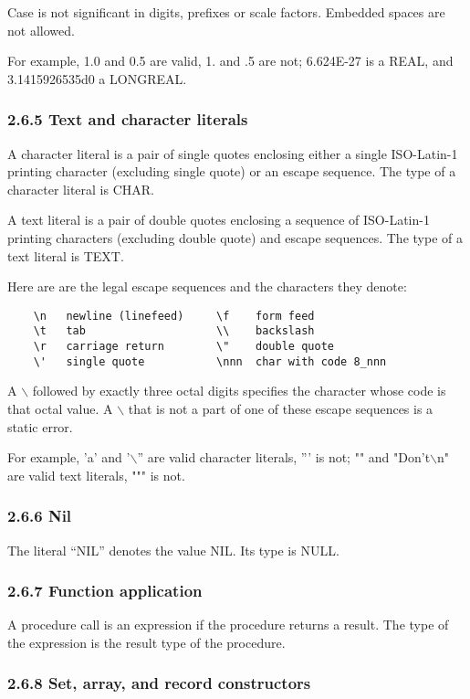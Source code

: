 \documentclass[10pt]{article}
\begin{document}
Case is not significant in digits, prefixes or scale factors.  Embedded spaces
are not allowed.

For example, 1.0 and 0.5 are valid, 1.  and .5 are not; 6.624E-27 is a REAL,
and 3.1415926535d0 a LONGREAL.

\subsubsection*{2.6.5 Text and character literals}

A character literal is a pair of single quotes enclosing either a single
ISO-Latin-1 printing character (excluding single quote) or an escape sequence.
The type of a character literal is CHAR.

A text literal is a pair of double quotes enclosing a sequence of ISO-Latin-1
printing characters (excluding double quote) and escape sequences.  The type
of a text literal is TEXT.

Here are are the legal escape sequences and the characters they denote:
\begin{verbatim}
    \n   newline (linefeed)     \f    form feed
    \t   tab                    \\    backslash
    \r   carriage return        \"    double quote
    \'   single quote           \nnn  char with code 8_nnn
\end{verbatim}
A $\backslash$ followed by exactly three octal digits specifies the character
whose code is that octal value.  A $\backslash$ that is not a part of one of
these escape sequences is a static error.

For example, 'a' and '$\backslash$'' are valid character literals, ''' is not;
"" and "Don't$\backslash$n" are valid text literals, """ is not.

\subsubsection*{2.6.6 Nil}

The literal ``NIL'' denotes the value NIL.  Its type is NULL.

\subsubsection*{2.6.7 Function application}

A procedure call is an expression if the procedure returns a result.  The type
of the expression is the result type of the procedure.

\subsubsection*{2.6.8 Set, array, and record constructors}
\end{document}
